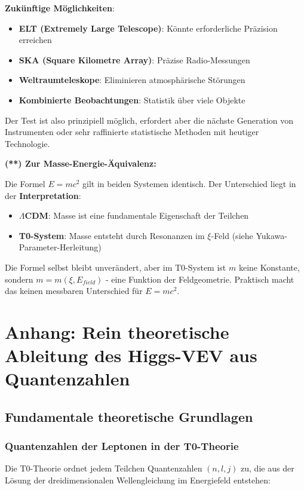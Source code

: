 \textbf{Zukünftige Möglichkeiten}:
\begin{itemize}
	\item \textbf{ELT (Extremely Large Telescope)}: Könnte erforderliche Präzision erreichen
	\item \textbf{SKA (Square Kilometre Array)}: Präzise Radio-Messungen
	\item \textbf{Weltraumteleskope}: Eliminieren atmosphärische Störungen
	\item \textbf{Kombinierte Beobachtungen}: Statistik über viele Objekte
\end{itemize}

Der Test ist also prinzipiell möglich, erfordert aber die nächste Generation von Instrumenten oder sehr raffinierte statistische Methoden mit heutiger Technologie.

\textbf{(**) Zur Masse-Energie-Äquivalenz:}

Die Formel $E = mc^2$ gilt in beiden Systemen identisch. Der Unterschied liegt in der \textbf{Interpretation}:

\begin{itemize}
	\item \textbf{$\Lambda$CDM}: Masse ist eine fundamentale Eigenschaft der Teilchen
	\item \textbf{T0-System}: Masse entsteht durch Resonanzen im $\xi$-Feld (siehe Yukawa-Parameter-Herleitung)
\end{itemize}

Die Formel selbst bleibt unverändert, aber im T0-System ist $m$ keine Konstante, sondern $m = m(\xi, E_{field})$ - eine Funktion der Feldgeometrie. Praktisch macht das keinen messbaren Unterschied für $E = mc^2$.
\appendix

\section{Anhang: Rein theoretische Ableitung des Higgs-VEV aus Quantenzahlen}

\subsection{Fundamentale theoretische Grundlagen}

\subsubsection{Quantenzahlen der Leptonen in der T0-Theorie}

Die T0-Theorie ordnet jedem Teilchen Quantenzahlen $(n, l, j)$ zu, die aus der Lösung der dreidimensionalen Wellengleichung im Energiefeld entstehen:

